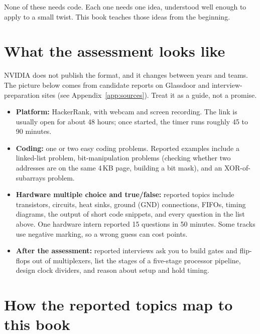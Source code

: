 None of these needs code. Each one needs one idea, understood well enough to apply to a small twist. This book teaches those ideas from the beginning.

\section*{What the assessment looks like}

NVIDIA does not publish the format, and it changes between years and teams. The picture below comes from candidate reports on Glassdoor and interview-preparation sites (see Appendix~\ref{app:sources}). Treat it as a guide, not a promise.

\begin{itemize}
  \item \textbf{Platform:} HackerRank, with webcam and screen recording. The link is usually open for about 48 hours; once started, the timer runs roughly 45 to 90 minutes.
  \item \textbf{Coding:} one or two easy coding problems. Reported examples include a linked-list problem, bit-manipulation problems (checking whether two addresses are on the same 4\,KB page, building a bit mask), and an XOR-of-subarrays problem.
  \item \textbf{Hardware multiple choice and true/false:} reported topics include transistors, circuits, heat sinks, ground (GND) connections, FIFOs, timing diagrams, the output of short code snippets, and every question in the list above. One hardware intern reported 15 questions in 50 minutes. Some tracks use negative marking, so a wrong guess can cost points.
  \item \textbf{After the assessment:} reported interviews ask you to build gates and flip-flops out of multiplexers, list the stages of a five-stage processor pipeline, design clock dividers, and reason about setup and hold timing.
\end{itemize}

\section*{How the reported topics map to this book}

